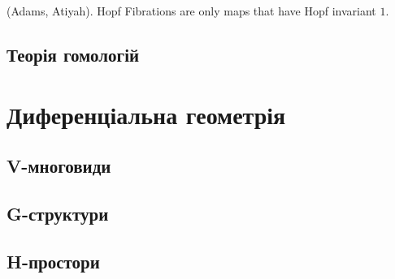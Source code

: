 \begin{theorem} (Adams, Atiyah).
Hopf Fibrations are only maps that have Hopf invariant $1$.
\end{theorem}

\subsection{Теорія гомологій}
\section{Диференціальна геометрія}
\subsection{V-многовиди}
\subsection{G-структури}
\subsection{H-простори}


